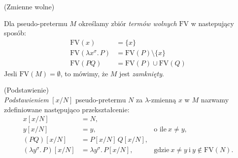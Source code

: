 \begin{definicja}(Zmienne wolne)
  \item Dla pseudo-pretermu \(M\) określamy zbiór \emph{termów wolnych} \(\mathrm{FV}\) w nastepujący sposób:
    \begin{align*}
      \mathrm{FV}(x) &= \{x\}\\
      \mathrm{FV}(\lambda x^\sigma .\, P)  &= \mathrm{FV}(P)\setminus\{x\}\\
      \mathrm{FV}(P Q) &= \mathrm{FV}(P)\cup\mathrm{FV}(Q)
    \end{align*}
Jesli \(\mathrm{FV}(M)=\emptyset\), to mówimy, że \(M\) jest \emph{zamknięty}. 
\end{definicja}

\begin{definicja}(Podstawienie)\\
\emph{Podstawieniem} \([x/N]\) pseudo-pretermu \(N\) za \(\lambda\)-zmienną \(x\) w \(M\) nazwamy zdefiniowane następująco przekształcenie:
  \begin{align*}
    x[x/N] &= N,\\
    y[x/N] &= y,\ &\text{o ile}\ x\neq y,\\
    (PQ)[x/N] &= P[x/N]\,Q[x/N],\\
    (\lambda y^\sigma.\, P)[x/N] &= \lambda y^\sigma .\,P[x/N],\ &\text{gdzie}\ x\neq y\ \text{i}\ y\not\in \mathrm{FV}(N).\\
  \end{align*}
\end{definicja}

